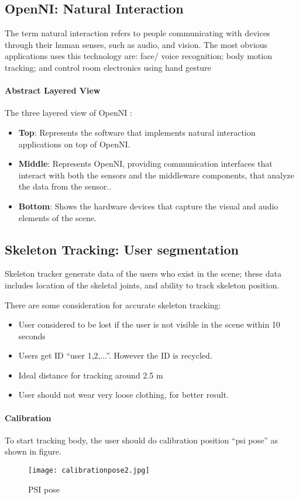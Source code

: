  \subsection{OpenNI: Natural Interaction}
 The term natural interaction refers to people communicating with devices through their human senses, such as audio, and vision. The most obvious applications uses this technology are: face/ voice recognition; body motion tracking; and control room electronics using hand gesture
 
 \paragraph{Abstract Layered View}
The three layered view of OpenNI :
\begin{itemize}
\item \textbf{Top}: Represents the software that implements natural interaction applications on top of OpenNI.
\item \textbf{Middle}: Represents OpenNI, providing communication interfaces that interact with both the sensors and the middleware components, that analyze the data from the sensor..
\item \textbf{Bottom}: Shows the hardware devices that capture the visual and audio elements of the scene.
\end{itemize}

\subsection {Skeleton Tracking: User segmentation}
Skeleton tracker generate  data of the users who exist in the scene; these data includes location of the skeletal joints, and ability to track skeleton position.

There are some consideration for accurate skeleton tracking:
\begin{itemize}
	\item User considered to be lost if the user is not visible in the scene within 10 seconds
	\item Users get ID “user 1,2,...”. However the ID is recycled.
	\item Ideal distance for tracking around 2.5 m
	\item User should not wear very loose clothing, for better result.
\end{itemize}
\paragraph{Calibration}
To start tracking body, the user should do calibration position “psi pose” as shown in figure.
	\begin{figure}[H]
    \centering
    \texttt{[image: calibrationpose2.jpg]}
        \caption{PSI pose}
\end{figure}

